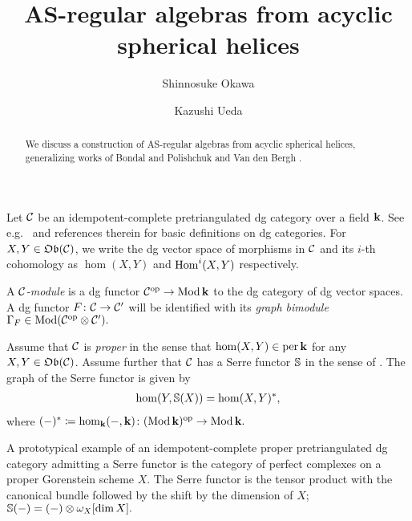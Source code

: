 \documentclass[a4paper,12pt]{amsart}
\title{AS-regular algebras from acyclic spherical helices}
\author{Shinnosuke Okawa}
\author{Kazushi Ueda}
\date{}
\begin{document}
%
%

\begin{abstract}
We discuss a
construction
of AS-regular algebras
from acyclic spherical helices,
generalizing works
of Bondal and Polishchuk
\cite{MR1230966}
and Van den Bergh
\cite{MR2836401}.
\end{abstract}

\maketitle


Let $\mathcal{C}$ be an idempotent-complete pretriangulated dg category
over a field $\mathbf{k}$.
See e.g.~\cite{MR2275593} and references therein
for basic definitions on dg categories.
For $X,Y \in \mathfrak{Ob}(\mathcal{C})$,
we write the dg vector space of morphisms
in $\mathcal{C}$
and its $i$-th cohomology
as $\hom(X,Y)$
and $\operatorname{Hom}^i(X,Y)$ respectively.

A \emph{$\mathcal{C}$-module} is
a dg functor $\mathcal{C}^{\mathrm{op}} \to \operatorname{Mod} \mathbf{k}$
to the dg category of dg vector spaces.
A dg functor $F \colon \mathcal{C} \to \mathcal{C}'$
will be identified with its \emph{graph bimodule}
$
\Gamma_F \in \operatorname{Mod} (\mathcal{C}^{\mathrm{op}} \otimes \mathcal{C}').
$

Assume that $\mathcal{C}$ is \emph{proper}
in the sense that
$\hom(X,Y) \in \operatorname{per} \mathbf{k}$
for any $X, Y \in \mathfrak{Ob}(\mathcal{C})$.
Assume further that $\mathcal{C}$ has a Serre functor $\mathbb{S}$
in the sense of \cite{MR1039961}.
The graph of the Serre functor is given by
\begin{align}
  \hom(Y, \mathbb{S}(X)) = \hom(X,Y)^\ast,
\end{align}
where
$
(-)^\ast \coloneqq \hom_{\mathbf{k}}(-, \mathbf{k})
 \colon (\operatorname{Mod} \mathbf{k})^{\mathrm{op}} \to \operatorname{Mod} \mathbf{k}.
$

A prototypical example
of an idempotent-complete proper pretriangulated dg category
admitting a Serre functor
is the category of perfect complexes
on a proper Gorenstein scheme $X$.
The Serre functor is the tensor product
with the canonical bundle
followed by the shift by the dimension of $X$;
$
 \mathbb{S}(-) = (-) \otimes \omega_X [\dim X].
$
\end{document}
